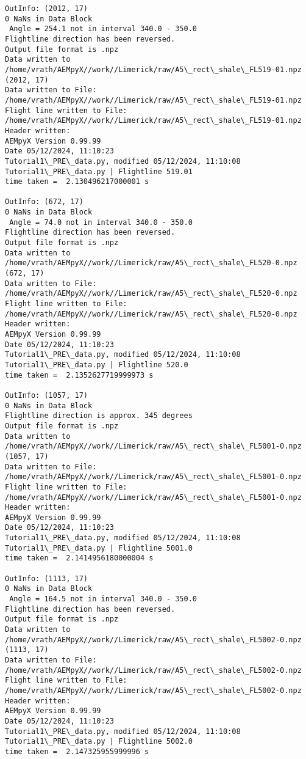 \documentclass[11pt]{article}
\begin{document}
\begin{Verbatim}[commandchars=\\\{\}]
OutInfo: (2012, 17)
0 NaNs in Data Block
 Angle = 254.1 not in interval 340.0 - 350.0
Flightline direction has been reversed.
Output file format is .npz
Data written to
/home/vrath/AEMpyX//work//Limerick/raw/A5\_rect\_shale\_FL519-01.npz
(2012, 17)
Data written to File:
/home/vrath/AEMpyX//work//Limerick/raw/A5\_rect\_shale\_FL519-01.npz
Flight line written to File:
/home/vrath/AEMpyX//work//Limerick/raw/A5\_rect\_shale\_FL519-01.npz
Header written:
AEMpyX Version 0.99.99
Date 05/12/2024, 11:10:23
Tutorial1\_PRE\_data.py, modified 05/12/2024, 11:10:08
Tutorial1\_PRE\_data.py | Flightline 519.01
time taken =  2.130496217000001 s

OutInfo: (672, 17)
0 NaNs in Data Block
 Angle = 74.0 not in interval 340.0 - 350.0
Flightline direction has been reversed.
Output file format is .npz
Data written to /home/vrath/AEMpyX//work//Limerick/raw/A5\_rect\_shale\_FL520-0.npz
(672, 17)
Data written to File:
/home/vrath/AEMpyX//work//Limerick/raw/A5\_rect\_shale\_FL520-0.npz
Flight line written to File:
/home/vrath/AEMpyX//work//Limerick/raw/A5\_rect\_shale\_FL520-0.npz
Header written:
AEMpyX Version 0.99.99
Date 05/12/2024, 11:10:23
Tutorial1\_PRE\_data.py, modified 05/12/2024, 11:10:08
Tutorial1\_PRE\_data.py | Flightline 520.0
time taken =  2.1352627719999973 s

OutInfo: (1057, 17)
0 NaNs in Data Block
Flightline direction is approx. 345 degrees
Output file format is .npz
Data written to
/home/vrath/AEMpyX//work//Limerick/raw/A5\_rect\_shale\_FL5001-0.npz
(1057, 17)
Data written to File:
/home/vrath/AEMpyX//work//Limerick/raw/A5\_rect\_shale\_FL5001-0.npz
Flight line written to File:
/home/vrath/AEMpyX//work//Limerick/raw/A5\_rect\_shale\_FL5001-0.npz
Header written:
AEMpyX Version 0.99.99
Date 05/12/2024, 11:10:23
Tutorial1\_PRE\_data.py, modified 05/12/2024, 11:10:08
Tutorial1\_PRE\_data.py | Flightline 5001.0
time taken =  2.1414956180000004 s

OutInfo: (1113, 17)
0 NaNs in Data Block
 Angle = 164.5 not in interval 340.0 - 350.0
Flightline direction has been reversed.
Output file format is .npz
Data written to
/home/vrath/AEMpyX//work//Limerick/raw/A5\_rect\_shale\_FL5002-0.npz
(1113, 17)
Data written to File:
/home/vrath/AEMpyX//work//Limerick/raw/A5\_rect\_shale\_FL5002-0.npz
Flight line written to File:
/home/vrath/AEMpyX//work//Limerick/raw/A5\_rect\_shale\_FL5002-0.npz
Header written:
AEMpyX Version 0.99.99
Date 05/12/2024, 11:10:23
Tutorial1\_PRE\_data.py, modified 05/12/2024, 11:10:08
Tutorial1\_PRE\_data.py | Flightline 5002.0
time taken =  2.147325955999996 s


\end{Verbatim}
\end{document}
